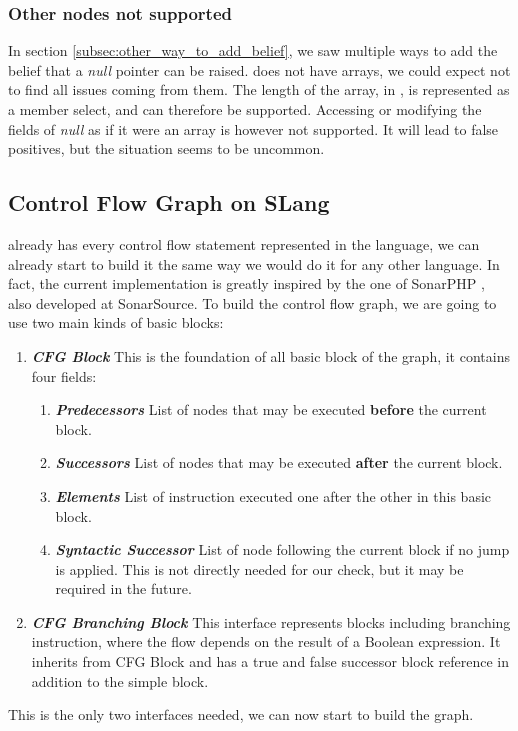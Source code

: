 \subsubsection{Other nodes not supported}
\label{subsubsec:other_nodes_not_supported}

In section \ref{subsec:other_way_to_add_belief}, we saw multiple ways to add the belief that a \emph{null} pointer can be raised. 
\slang{} does not have arrays, we could expect not to find all issues coming from them. 
The length of the array, in \slang{}, is represented as a member select, and can therefore be supported.
Accessing or modifying the fields of \emph{null} as if it were an array is however not supported.
It will lead to false positives, but the situation seems to be uncommon.

\subsection{Control Flow Graph on SLang}
\label{subsec:cfg_on_slang}

\slang{} already has every control flow statement represented in the language, we can already start to build it the same way we would do it for any other language. 
In fact, the current implementation is greatly inspired by the one of SonarPHP \cite{SonarPHP:2019:Online}, also developed at SonarSource.
To build the control flow graph, we are going to use two main kinds of basic blocks:

\begin{enumerate}
	\item \textbf{\textit{CFG Block}} \newline 
	This is the foundation of all basic block of the graph, it contains four fields:
	\begin{enumerate}
		\item \textbf{\textit{Predecessors}} \newline
		List of nodes that may be executed \textbf{before} the current block.
		\item \textbf{\textit{Successors}} \newline
		List of nodes that may be executed \textbf{after} the current block.
		\item \textbf{\textit{Elements}} \newline
		List of instruction executed one after the other in this basic block. 
		\item \textbf{\textit{Syntactic Successor}} \newline
		List of node following the current block if no jump is applied. 
		This is not directly needed for our check, but it may be required in the future.
	\end{enumerate}
	\item \textbf{\textit{CFG Branching Block}} \newline 
	This interface represents blocks including branching instruction, where the flow depends on the result of a Boolean expression. 
	It inherits from CFG Block and has a true and false successor block reference in addition to the simple block.
	\newline 
\end{enumerate}
This is the only two interfaces needed, we can now start to build the graph.

